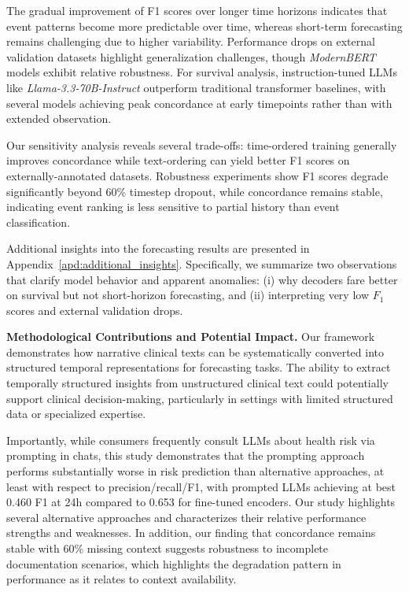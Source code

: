 \documentclass[letterpaper]{article} %
\begin{document}
The gradual improvement of F1 scores over longer time horizons indicates that event patterns become more predictable over time, whereas short-term forecasting remains challenging due to higher variability. Performance drops on external validation datasets highlight generalization challenges, though \textit{ModernBERT} models exhibit relative robustness. For survival analysis, instruction-tuned LLMs like \textit{Llama-3.3-70B-Instruct} outperform traditional transformer baselines, with several models achieving peak concordance at early timepoints rather than with extended observation.

Our sensitivity analysis reveals several trade-offs: time-ordered training generally improves concordance while text-ordering can yield better F1 scores on externally-annotated datasets. Robustness experiments show F1 scores degrade significantly beyond 60\% timestep dropout, while concordance remains stable, indicating event ranking is less sensitive to partial history than event classification. 

Additional insights into the forecasting results are presented in Appendix~\ref{apd:additional_insights}. Specifically, we summarize two observations that clarify model behavior and apparent anomalies: (i) why decoders fare better on survival but not short-horizon forecasting, and (ii) interpreting very low $F_{1}$ scores and external validation drops.

\textbf{Methodological Contributions and Potential Impact.} Our framework demonstrates how narrative clinical texts can be systematically converted into structured temporal representations for forecasting tasks. The ability to extract temporally structured insights from unstructured clinical text could potentially support clinical decision-making, particularly in settings with limited structured data or specialized expertise. 

Importantly, while consumers frequently consult LLMs about health risk via prompting in chats, this study demonstrates that the prompting approach performs substantially worse in risk prediction than alternative approaches, at least with respect to precision/recall/F1, with prompted LLMs achieving at best 0.460 F1 at 24h compared to 0.653 for fine-tuned encoders.
Our study highlights several alternative approaches and characterizes their relative performance strengths and weaknesses.
In addition, our finding that concordance remains stable with 60\% missing context suggests robustness to incomplete documentation scenarios, which highlights the degradation pattern in performance as it relates to context availability. 
\end{document}
